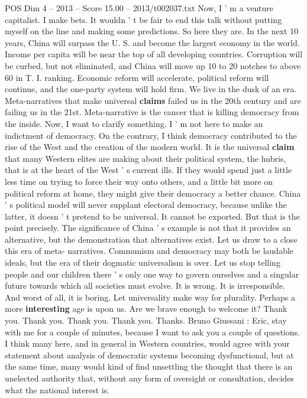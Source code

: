 \begin{textsample}{POS Dim 4 – 2013 – Score 15.00 – 2013/t002037.txt}
Now, I ' m a venture capitalist.
I make bets.
It wouldn ' t be fair to end this talk without putting myself on the line and making some predictions.
So here they are.
In the next 10 years, China will surpass the U.
S. and become the largest economy in the world.
Income per capita will be near the top of all developing countries.
Corruption will be curbed, but not eliminated, and China will move up 10 to 20 notches to above 60 in T.
I. ranking.
Economic reform will accelerate, political reform will continue, and the one-party system will hold firm.
We live in the dusk of an era.
Meta-narratives that make universal \textbf{claims} failed us in the 20th century and are failing us in the 21st.
Meta-narrative is the cancer that is killing democracy from the inside.
Now, I want to clarify something.
I ' m not here to make an indictment of democracy.
On the contrary, I think democracy contributed to the rise of the West and the creation of the modern world.
It is the universal \textbf{claim} that many Western elites are making about their political system, the hubris, that is at the heart of the West ' s current ills.
If they would spend just a little less time on trying to force their way onto others, and a little bit more on political reform at home, they might give their democracy a better chance.
China ' s political model will never supplant electoral democracy, because unlike the latter, it doesn ' t pretend to be universal.
It cannot be exported.
But that is the point precisely.
The significance of China ' s example is not that it provides an alternative, but the demonstration that alternatives exist.
Let us draw to a close this era of meta- narratives.
Communism and democracy may both be laudable ideals, but the era of their dogmatic universalism is over.
Let us stop telling people and our children there ' s only one way to govern ourselves and a singular future towards which all societies must evolve.
It is wrong.
It is irresponsible.
And worst of all, it is boring.
Let universality make way for plurality.
Perhaps a more \textbf{interesting} age is upon us.
Are we brave enough to welcome it?
Thank you.
Thank you.
Thank you.
Thank you.
Thanks.
Bruno Giussani : Eric, stay with me for a couple of minutes, because I want to ask you a couple of questions.
I think many here, and in general in Western countries, would agree with your statement about analysis of democratic systems becoming dysfunctional, but at the same time, many would kind of find unsettling the thought that there is an unelected authority that, without any form of oversight or consultation, decides what the national interest is.

\end{textsample}
